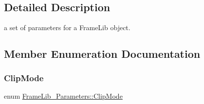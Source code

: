 \subsection{Detailed Description}
a set of parameters for a Frame\+Lib object. 

\subsection{Member Enumeration Documentation}
\mbox{\label{class_frame_lib___parameters_afcefd8a6a664599b93f635538d95265a}} 
\subsubsection{\texorpdfstring{Clip\+Mode}{ClipMode}}
{\footnotesize\ttfamily enum \hyperlink{class_frame_lib___parameters_afcefd8a6a664599b93f635538d95265a}{Frame\+Lib\+\_\+\+Parameters\+::\+Clip\+Mode}}

